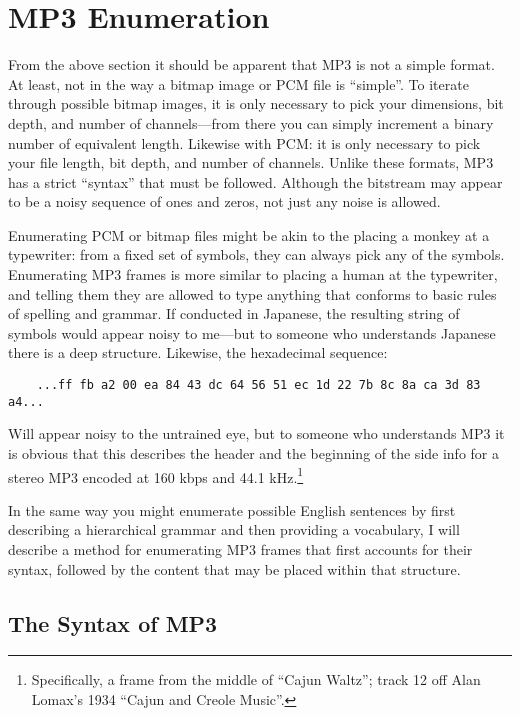 \documentclass{thesis}
\begin{document}
\section{MP3 Enumeration}

	From the above section it should be apparent that MP3 is not a simple format. At least, not in the way a bitmap image or PCM file is ``simple''. To iterate through possible bitmap images, it is only necessary to pick your dimensions, bit depth, and number of channels---from there you can simply increment a binary number of equivalent length. Likewise with PCM: it is only necessary to pick your file length, bit depth, and number of channels. Unlike these formats, MP3 has a strict ``syntax'' that must be followed. Although the bitstream may appear to be a noisy sequence of ones and zeros, not just any noise is allowed.
	
	Enumerating PCM or bitmap files might be akin to the placing a monkey at a typewriter: from a fixed set of symbols, they can always pick any of the symbols. Enumerating MP3 frames is more similar to placing a human at the typewriter, and telling them they are allowed to type anything that conforms to basic rules of spelling and grammar. If conducted in Japanese, the resulting string of symbols would appear noisy to me---but to someone who understands Japanese there is a deep structure. Likewise, the hexadecimal sequence:
	
	\begin{verbatim}
	...ff fb a2 00 ea 84 43 dc 64 56 51 ec 1d 22 7b 8c 8a ca 3d 83 a4...
	\end{verbatim}
	
	Will appear noisy to the untrained eye, but to someone who understands MP3 it is obvious that this describes the header and the beginning of the side info for a stereo MP3 encoded at 160 kbps and 44.1 kHz.\footnote{Specifically, a frame from the middle of ``Cajun Waltz''; track 12 off Alan Lomax's 1934 ``Cajun and Creole Music''.}
	
	In the same way you might enumerate possible English sentences by first describing a hierarchical grammar and then providing a vocabulary, I will describe a method for enumerating MP3 frames that first accounts for their syntax, followed by the content that may be placed within that structure.
	
\subsection{The Syntax of MP3}
\end{document}
